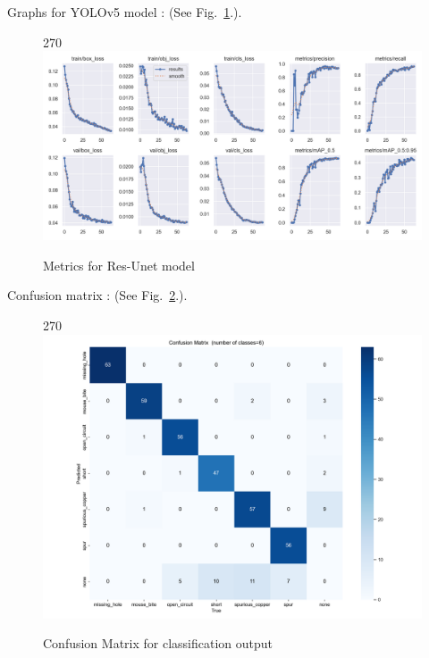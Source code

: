 \documentclass[12pt]{article}
\begin{document}
Graphs for YOLOv5 model : (See Fig.~\ref{fig:graphs_yolo}.).
\begin{figure}[p]
    \centering
    \begin{turn}{270}
    \includegraphics[width=1\paperwidth,height=1\paperheight,keepaspectratio]{./graphics/graphs_yolo.png}
    \end{turn}
    \caption{Metrics for Res-Unet model}
    \label{fig:graphs_yolo}
\end{figure}
\restoregeometry

\clearpage

Confusion matrix : (See Fig.~\ref{fig:confusion_yolo}.).
\begin{figure}[H]
    \centering
    \begin{turn}{270}
    \includegraphics[width=0.7\paperwidth,height=0.7\paperheight,keepaspectratio]{./graphics/confusion_matrix_yolo.png}
    \end{turn}
    \caption{Confusion Matrix for classification output}
    \label{fig:confusion_yolo}
\end{figure}
\end{document}
